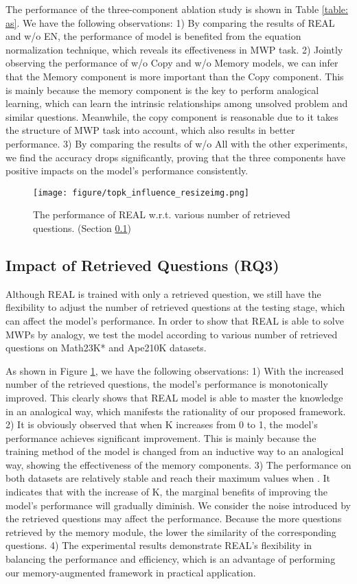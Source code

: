 \documentclass[11pt, a4paper]{article}
\begin{document}
The performance of the three-component ablation study is shown in Table \ref{table: as}. We have the following observations: 
1) By comparing the results of REAL and w/o EN, the performance of model is benefited from the equation normalization technique, which reveals its effectiveness in MWP task.
2) Jointly observing the performance of w/o Copy and w/o Memory models, we can infer that the Memory component is more important than the Copy component. This is mainly because the memory component is the key to perform analogical learning, which can learn the intrinsic relationships among unsolved problem and similar questions. Meanwhile, the copy component is reasonable due to it takes the structure of MWP task into account, which also results in better performance.  
3) By comparing the results of w/o All with the other experiments, we find the accuracy drops significantly, proving that the three components have positive impacts on the model's performance consistently.

\begin{figure}[t]
  \centering
  \texttt{[image: figure/topk\_influence\_resizeimg.png]}
  \caption{The performance of REAL w.r.t. various number of retrieved questions. (Section \ref{section: RQ3})}
  \label{fig: top-K}
\end{figure}

\subsection{Impact of Retrieved Questions (RQ3)} \label{section: RQ3}
Although REAL is trained with only a retrieved question, we still have the flexibility to adjust the number of retrieved questions at the testing stage, which can affect the model's performance. In order to show that REAL is able to solve MWPs by analogy, we test the model according to various number of retrieved questions on Math23K* and Ape210K datasets. 

As shown in Figure \ref{fig: top-K}, we have the following observations: 
1) With the increased number of the retrieved questions, the model's performance is monotonically improved. This clearly shows that REAL model is able to master the knowledge in an analogical way, which manifests the rationality of our proposed framework. 
2) It is obviously observed that when K increases from 0 to 1, the model's performance achieves significant improvement. This is mainly because the training method of the model is changed from an inductive way to an analogical way, showing the effectiveness of the memory components. 
3) The performance on both datasets are relatively stable and reach their maximum values when . It indicates that with the increase of K, the marginal benefits of improving the model's performance will gradually diminish. We consider the noise introduced by the retrieved questions may affect the performance. Because the more questions retrieved by the memory module, the lower the similarity of the corresponding questions. 4) The experimental results demonstrate REAL's flexibility in balancing the performance and efficiency, which is an advantage of performing our memory-augmented framework in practical application.
\end{document}
